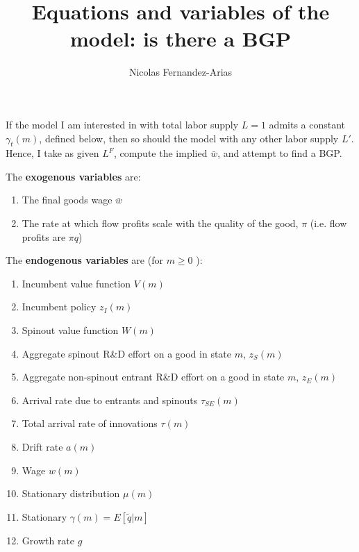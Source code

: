 \documentclass[12pt,english]{article}
\theoremstyle{remark}
\begin{document}
	
\title{Equations and variables of the model: is there a BGP}
\author{Nicolas Fernandez-Arias}
\maketitle

If the model I am interested in with total labor supply $L = 1$ admits a constant $\gamma_t(m)$, defined below, then so should the model with any other labor supply $L'$. Hence, I take as given $L^F$, compute the implied $\bar{w}$, and attempt to find a BGP. 

The \textbf{exogenous variables }are:
\begin{enumerate}
	\item The final goods wage $\bar{w}$
	\item The rate at which flow profits scale with the quality of the good, $\pi$ (i.e. flow profits are $\pi q $)
\end{enumerate}

The \textbf{endogenous variables }are \big(for $m \ge 0$ \big):
\begin{enumerate}
	\item Incumbent value function $V(m)$
	\item Incumbent policy $z_I(m)$
	\item Spinout value function $W(m)$
	\item Aggregate spinout R\&D effort on a good in state $m$, $z_S(m)$
	\item Aggregate non-spinout entrant R\&D effort on a good in state $m$, $z_E(m)$
	\item Arrival rate due to entrants and spinouts $\tau_{SE}(m)$
	\item Total arrival rate of innovations $\tau(m)$
	\item Drift rate $a(m)$
	\item Wage $w(m)$
	\item Stationary distribution $\mu(m)$ 
	\item Stationary $\gamma(m) = E[\tilde{q}|m]$
	\item Growth rate $g$
\end{enumerate}
\end{document}
